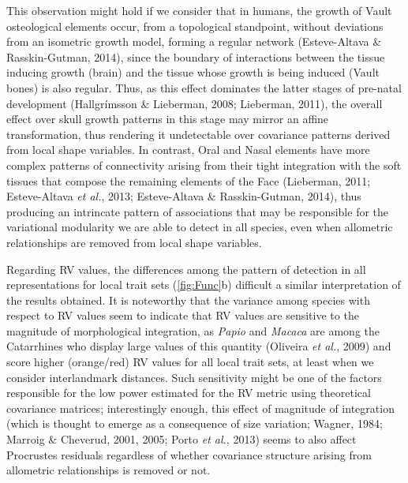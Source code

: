 \documentclass[12pt,]{article}
\begin{document}
This observation might hold if we consider that in humans, the growth of
Vault osteological elements occur, from a topological standpoint,
without deviations from an isometric growth model, forming a regular
network (Esteve-Altava \& Rasskin-Gutman, 2014), since the boundary of
interactions between the tissue inducing growth (brain) and the tissue
whose growth is being induced (Vault bones) is also regular. Thus, as
this effect dominates the latter stages of pre-natal development
(Hallgrímsson \& Lieberman, 2008; Lieberman, 2011), the overall effect
over skull growth patterns in this stage may mirror an affine
transformation, thus rendering it undetectable over covariance patterns
derived from local shape variables. In contrast, Oral and Nasal elements
have more complex patterns of connectivity arising from their tight
integration with the soft tissues that compose the remaining elements of
the Face (Lieberman, 2011; Esteve-Altava \emph{et al.}, 2013;
Esteve-Altava \& Rasskin-Gutman, 2014), thus producing an intrincate
pattern of associations that may be responsible for the variational
modularity we are able to detect in all species, even when allometric
relationships are removed from local shape variables.

Regarding RV values, the differences among the pattern of detection in
all representations for local trait sets (\autoref{fig:Func}b) difficult
a similar interpretation of the results obtained. It is noteworthy that
the variance among species with respect to RV values seem to indicate
that RV values are sensitive to the magnitude of morphological
integration, as \emph{Papio} and \emph{Macaca} are among the Catarrhines
who display large values of this quantity (Oliveira \emph{et al.}, 2009)
and score higher (orange/red) RV values for all local trait sets, at
least when we consider interlandmark distances. Such sensitivity might
be one of the factors responsible for the low power estimated for the RV
metric using theoretical covariance matrices; interestingly enough, this
effect of magnitude of integration (which is thought to emerge as a
consequence of size variation; Wagner, 1984; Marroig \& Cheverud, 2001,
2005; Porto \emph{et al.}, 2013) seems to also affect Procrustes
residuals regardless of whether covariance structure arising from
allometric relationships is removed or not.
\end{document}
